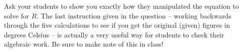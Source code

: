 





Ask your students to show you exactly how they manipulated the equation to solve for $R$.  The last instruction given in the question -- working backwards through the five calculations to see if you get the original (given) figures in degrees Celsius -- is actually a very useful way for students to check their algebraic work.  Be sure to make note of this in class!




